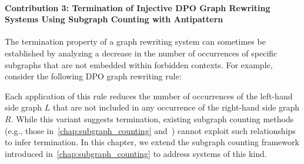 \paragraph{Contribution 3: Termination of Injective DPO Graph Rewriting Systems Using Subgraph Counting with Antipattern}
The termination property of a graph rewriting system can sometimes be established by analyzing a decrease in the number of occurrences of specific subgraphs that are not embedded within forbidden contexts. For example, consider the following DPO graph rewriting rule:
 

Each application of this rule reduces the number of occurrences of the left-hand side graph $L$ that are not included in any occurrence of the right-hand side graph $ R $. While this variant suggests termination, existing subgraph counting methods (e.g., those in~\autoref{chap:subgraph_counting} and~\cite{overbeek2024termination_lmcs}) cannot exploit such relationships to infer termination. In this chapter, we extend the subgraph counting framework introduced in~\autoref{chap:subgraph_counting} to address systems of this kind.

